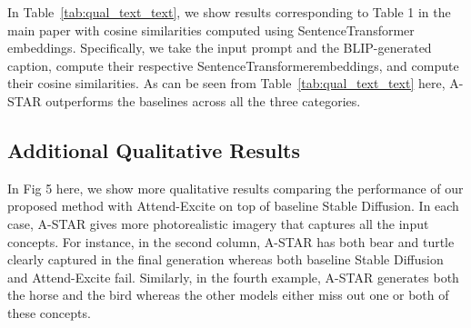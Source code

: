 \documentclass[10pt,twocolumn,letterpaper]{article}
\begin{document}
\begin{appendices}
In Table~\ref{tab:qual_text_text}, we show results corresponding to Table 1 in the main paper with cosine similarities computed using SentenceTransformer \cite{reimers2019sentence} embeddings. Specifically, we take the input prompt and the BLIP-generated caption, compute their respective  SentenceTransformerembeddings, and compute their cosine similarities. As can be seen from Table~\ref{tab:qual_text_text} here, A-STAR outperforms the baselines across all the three categories. 


\begin{table}[]

\vspace{-8pt}
    \caption{Text-text similarities between the text prompts and BLIP-generated captions over the generated images.}
    \vspace{-4pt}
    \label{tab:qual_text_text}

\end{table}

\subsection{Additional Qualitative Results}
\label{sec:addQual}

In Fig 5 here, we show more qualitative results comparing the performance of our proposed method with Attend-Excite on top of baseline Stable Diffusion. In each case, A-STAR gives more photorealistic imagery that captures all the input concepts. For instance, in the second column, A-STAR has both bear and turtle clearly captured in the final generation whereas both baseline Stable Diffusion and Attend-Excite fail. Similarly, in the fourth example, A-STAR generates both the horse and the bird whereas the other models either miss out one or both of these concepts. 


\end{appendices}
\end{document}
